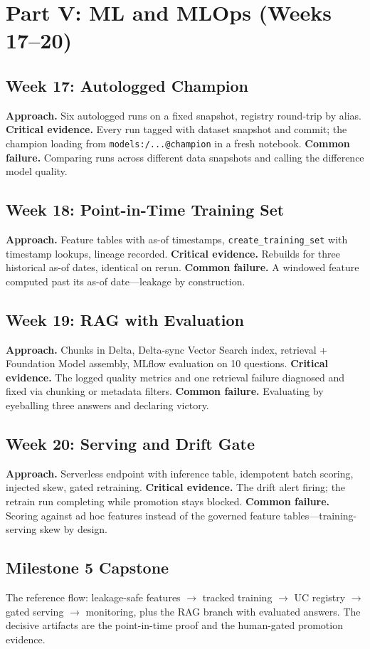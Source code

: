 \section{Part V: ML and MLOps (Weeks 17--20)}
\subsection{Week 17: Autologged Champion}
\textbf{Approach.} Six autologged runs on a fixed snapshot, registry round-trip by alias.
\textbf{Critical evidence.} Every run tagged with dataset snapshot and commit; the champion loading
from \texttt{models:/...@champion} in a fresh notebook.
\textbf{Common failure.} Comparing runs across different data snapshots and calling the difference
model quality.

\subsection{Week 18: Point-in-Time Training Set}
\textbf{Approach.} Feature tables with as-of timestamps, \texttt{create\_training\_set} with
timestamp lookups, lineage recorded.
\textbf{Critical evidence.} Rebuilds for three historical as-of dates, identical on rerun.
\textbf{Common failure.} A windowed feature computed past its as-of date---leakage by construction.

\subsection{Week 19: RAG with Evaluation}
\textbf{Approach.} Chunks in Delta, Delta-sync Vector Search index, retrieval + Foundation Model
assembly, MLflow evaluation on 10 questions.
\textbf{Critical evidence.} The logged quality metrics and one retrieval failure diagnosed and
fixed via chunking or metadata filters.
\textbf{Common failure.} Evaluating by eyeballing three answers and declaring victory.

\subsection{Week 20: Serving and Drift Gate}
\textbf{Approach.} Serverless endpoint with inference table, idempotent batch scoring, injected
skew, gated retraining.
\textbf{Critical evidence.} The drift alert firing; the retrain run completing while promotion
stays blocked.
\textbf{Common failure.} Scoring against ad hoc features instead of the governed feature
tables---training-serving skew by design.

\subsection{Milestone 5 Capstone}
The reference flow: leakage-safe features $\rightarrow$ tracked training $\rightarrow$ UC registry
$\rightarrow$ gated serving $\rightarrow$ monitoring, plus the RAG branch with evaluated answers.
The decisive artifacts are the point-in-time proof and the human-gated promotion evidence.

